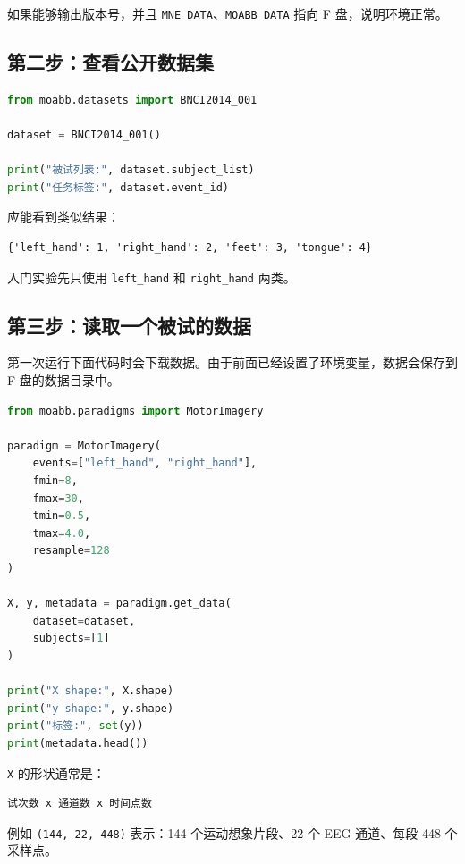 \documentclass[UTF8,a4paper,12pt]{ctexart}
\begin{document}
如果能够输出版本号，并且 \texttt{MNE\_DATA}、\texttt{MOABB\_DATA} 指向 F 盘，说明环境正常。

\subsection{第二步：查看公开数据集}

\begin{lstlisting}[language=Python,caption={查看 \texttt{BNCI2014\_001} 数据集信息}]
from moabb.datasets import BNCI2014_001

dataset = BNCI2014_001()

print("被试列表:", dataset.subject_list)
print("任务标签:", dataset.event_id)
\end{lstlisting}

应能看到类似结果：

\begin{lstlisting}[language={}]
{'left_hand': 1, 'right_hand': 2, 'feet': 3, 'tongue': 4}
\end{lstlisting}

入门实验先只使用 \texttt{left\_hand} 和 \texttt{right\_hand} 两类。

\subsection{第三步：读取一个被试的数据}

第一次运行下面代码时会下载数据。由于前面已经设置了环境变量，数据会保存到 F 盘的数据目录中。

\begin{lstlisting}[language=Python,caption={读取一个被试的左右手运动想象数据}]
from moabb.paradigms import MotorImagery

paradigm = MotorImagery(
    events=["left_hand", "right_hand"],
    fmin=8,
    fmax=30,
    tmin=0.5,
    tmax=4.0,
    resample=128
)

X, y, metadata = paradigm.get_data(
    dataset=dataset,
    subjects=[1]
)

print("X shape:", X.shape)
print("y shape:", y.shape)
print("标签:", set(y))
print(metadata.head())
\end{lstlisting}

\texttt{X} 的形状通常是：

\begin{lstlisting}[language={}]
试次数 x 通道数 x 时间点数
\end{lstlisting}

例如 \texttt{(144, 22, 448)} 表示：144 个运动想象片段、22 个 EEG 通道、每段 448 个采样点。
\end{document}

